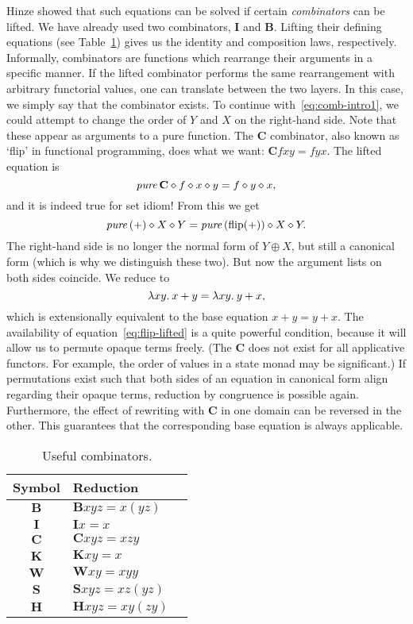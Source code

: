 Hinze showed that such equations can be solved if certain \emph{combinators}
can be lifted.
We have already used two combinators, $\mathbf{I}$ and $\mathbf{B}$.
Lifting their defining equations (see Table~\ref{tab:combinators}) gives us
the identity and composition laws, respectively.
Informally, combinators are functions which rearrange their arguments in a
specific manner.
If the lifted combinator performs the same rearrangement with arbitrary
functorial values, one can translate between the two layers.
In this case, we simply say that the combinator exists.
To continue with~\eqref{eq:comb-intro1}, we could attempt to change the order of
$Y$ and $X$ on the right-hand side.
Note that these appear as arguments to a pure function.
The $\mathbf{C}$ combinator, also known as `flip' in functional programming,
does what we want: $\mathbf{C}fxy = fyx$.
The lifted equation is
\begin{equation}\label{eq:flip-lifted}
	\operatorname{\mathit{pure}} \mathbf{C} \diamond f \diamond x \diamond y = f \diamond y \diamond x,
\end{equation}
and it is indeed true for set idiom!
From this we get
\begin{equation}\label{eq:comb-intro2}
	\operatorname{\mathit{pure}}{(+)} \diamond X \diamond Y = \operatorname{\mathit{pure}}{(\operatorname{flip}(+))} \diamond X \diamond Y.
\end{equation}
The right-hand side is no longer the normal form of $Y \oplus X$, but still
a canonical form (which is why we distinguish these two).
But now the argument lists on both sides coincide.
We reduce to
\[ \lambda xy.\>x + y = \lambda xy.\>y + x, \]
which is extensionally equivalent to the base equation $x + y = y + x$.
The availability of equation~\eqref{eq:flip-lifted} is a quite powerful
condition, because it will allow us to permute opaque terms freely.
(The $\mathbf{C}$ does not exist for all applicative functors.
For example, the order of values in a state monad may be significant.)
If permutations exist such that both sides of an equation in canonical form
align regarding their opaque terms, reduction by congruence is possible again.
Furthermore, the effect of rewriting with $\mathbf{C}$ in one domain can be
reversed in the other.
This guarantees that the corresponding base equation is always applicable.

\begin{table}\centering
\begin{tabular}{cll}
Symbol & Reduction \\
\hline
$\mathbf{B}$ & $\mathbf{B} x y z = x (y z)$ \\
$\mathbf{I}$ & $\mathbf{I} x = x$ \\
\hline
$\mathbf{C}$ & $\mathbf{C} x y z = x z y$ \\
$\mathbf{K}$ & $\mathbf{K} x y = x$ \\
$\mathbf{W}$ & $\mathbf{W} x y = x y y$ \\
$\mathbf{S}$ & $\mathbf{S} x y z = x z (y z)$ \\
$\mathbf{H}$ & $\mathbf{H} x y z = x y (z y)$ \\
\end{tabular}
\caption{Useful combinators.}
\label{tab:combinators}
\end{table}

